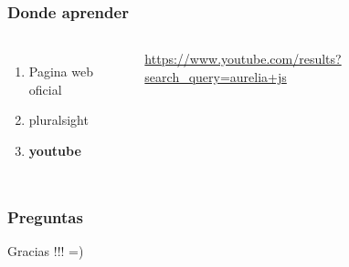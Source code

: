 \documentclass{beamer}
\begin{document}
\begin{frame}
\frametitle{Donde aprender}
\begin{columns}[c] %
\begin{enumerate}
\item Pagina web oficial
\item pluralsight
\item \textbf{youtube}
\end{enumerate}

{\color{blue}\url{https://www.youtube.com/results?search_query=aurelia+js}}
\end{columns}
\end{frame}
\begin{frame}
\frametitle{Preguntas}
\end{frame}
\begin{frame}
\Huge{\centerline{Gracias !!! =)}}
\end{frame}

\end{document}
